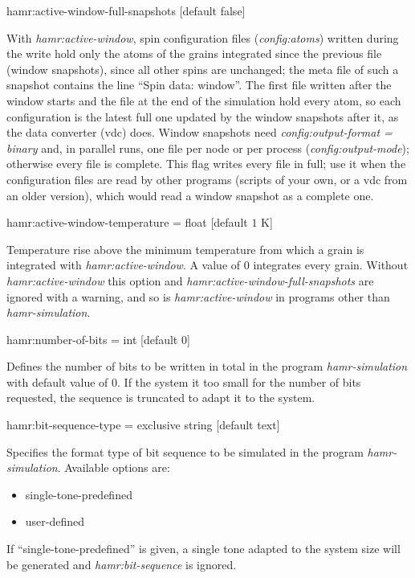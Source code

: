 {\zicf hamr:active-window-full-snapshots [default false]}
With \textit{hamr:active-window}, spin configuration files (\textit{config:atoms}) written during the write hold only the atoms of the grains integrated since the previous file (window snapshots), since all other spins are unchanged; the meta file of such a snapshot contains the line ``Spin data: window''. The first file written after the window starts and the file at the end of the simulation hold every atom, so each configuration is the latest full one updated by the window snapshots after it, as the data converter (vdc) does. Window snapshots need \textit{config:output-format = binary} and, in parallel runs, one file per node or per process (\textit{config:output-mode}); otherwise every file is complete. This flag writes every file in full; use it when the configuration files are read by other programs (scripts of your own, or a vdc from an older version), which would read a window snapshot as a complete one.

{\zicf hamr:active-window-temperature = float [default $1$ K]}
Temperature rise above the minimum temperature from which a grain is integrated with \textit{hamr:active-window}. A value of 0 integrates every grain. Without \textit{hamr:active-window} this option and \textit{hamr:active-window-full-snapshots} are ignored with a warning, and so is \textit{hamr:active-window} in programs other than \textit{hamr-simulation}.

{\zicf hamr:number-of-bits = int [default $0$]}
Defines the number of bits to be written in total in the program \textit{hamr-simulation} with default value of 0.
If the system it too small for the number of bits requested, the sequence is truncated to adapt it to the system.

{\zicf hamr:bit-sequence-type =  exclusive string [default text]}
Specifies the format type of bit sequence to be simulated in the program \textit{hamr-simulation}. Available options are:
\begin{itemize}
	\item[] single-tone-predefined
	\item[] user-defined
\end{itemize}
If ``single-tone-predefined'' is given, a single tone adapted to the system size will be generated and \textit{ hamr:bit-sequence} is ignored.


